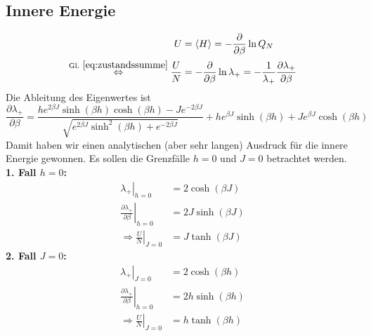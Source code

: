 		\subsection{Innere Energie}
		\begin{align}
				U&=\left<H\right>=-\frac{\partial}{\partial\beta}\ln Q_N \nonumber\\
				\overset{\mathrm{Gl.~\eqref{eq:zustandssumme}}}{\Leftrightarrow}\frac{U}{N}&=-\frac{\partial}{\partial\beta}\ln\lambda_+=-\frac{1}{\lambda_+}\frac{\partial\lambda_+}{\partial\beta}\label{eq:energy}
		\end{align}
		Die Ableitung des Eigenwertes ist
		\begin{equation*}
				\frac{\partial\lambda_+}{\partial\beta}=\frac{he^{2\beta J}\sinh\left(\beta h\right)\cosh\left(\beta h\right)-J e^{-2\beta J}}{\sqrt{e^{2\beta J}\sinh^2\left(\beta h\right)+e^{-2\beta J}}}+h e^{\beta J}\sinh\left(\beta h\right)+J e^{\beta J}\cosh\left(\beta h\right)
		\end{equation*}
		Damit haben wir einen analytischen (aber sehr langen) Ausdruck für die innere Energie gewonnen. Es sollen die Grenzfälle $h=0$ und $J=0$ betrachtet werden.\\[0.5mm]
		\textbf{1. Fall $h=0$:}
  \begin{align}
				{\left.\lambda_+\right|}_{h=0}&=2\cosh\left(\beta J\right)\nonumber\\
				{\left.\frac{\partial\lambda_+}{\partial\beta}\right|}_{h=0}&=2J\sinh\left(\beta J\right)\nonumber\\
				\Rightarrow {\left.\frac{U}{N}\right|}_{J=0}&=J\tanh\left(\beta J\right)\label{eq:energyh0}
		\end{align}
		\textbf{2. Fall $J=0$:}
		\begin{align}
				{\left.\lambda_+\right|}_{J=0}&=2\cosh\left(\beta h\right)\nonumber\\
				{\left.\frac{\partial\lambda_+}{\partial\beta}\right|}_{h=0}&=2h\sinh\left(\beta h\right)\nonumber\\
				\Rightarrow {\left.\frac{U}{N}\right|}_{J=0}&=h\tanh\left(\beta h\right)\label{eq:energyJ0}
		\end{align}


